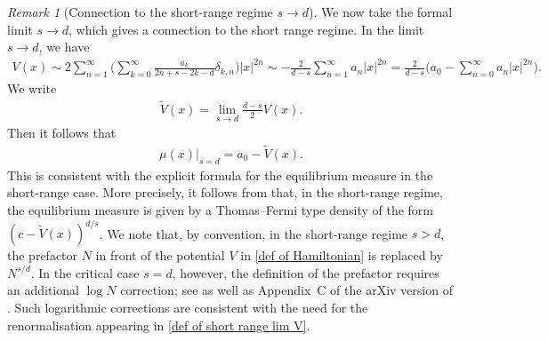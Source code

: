 \documentclass[10pt]{amsart}
\theoremstyle{plain}
\theoremstyle{remark}
\newtheorem{rem}{Remark}
\numberwithin{equation}{section}
\begin{document}
 
\begin{rem}[Connection to the short-range regime $s \to d$] 
We now take the formal limit $s \to d$, which gives a connection to the short range regime. 
In the limit $s \to d$, we have  
\begin{align*}
V(x) \sim   2   \sum_{n=1}^\infty  \bigg( \sum_{k=0}^\infty \frac{ a_k}{ 2n+s-2k-d } \delta_{k,n} \bigg) |x|^{2n} \sim -\frac{2}{d-s} \sum_{n=1}^\infty a_n |x|^{2n} = \frac{2}{d-s} \bigg( a_0- \sum_{n=0}^\infty a_n |x|^{2n} \bigg). 
\end{align*}
We write  
\begin{align} \label{def of short range lim V}
\widetilde{V}(x) = \lim_{s\to d} \frac{d-s}{2} V(x). 
\end{align}
Then it follows that  
\begin{align}
\mu(x) |_{s=d} =  a_0 -  \widetilde{V}(x) . 
\end{align}  
This is consistent with the explicit formula for the equilibrium measure in the short-range case. More precisely, it follows from \cite{ADKKMMS19,HLSS18} that, in the short-range regime, the equilibrium measure is given by a Thomas--Fermi type density of the form $(c-\widetilde{V}(x))^{d/s}$. 
We note that, by convention, in the short-range regime $s>d$, the prefactor $N$ in front of the potential $V$ in \eqref{def of Hamiltonian} is replaced by $N^{s/d}$. In the critical case $s=d$, however, the definition of the prefactor requires an additional $\log N$ correction; see \cite{HS04,HS05,KS98} as well as Appendix~C of the arXiv version of \cite{ADKKMMS19}. Such logarithmic corrections are consistent with the need for the renormalisation appearing in \eqref{def of short range lim V}.
\end{rem} 
\end{document}
